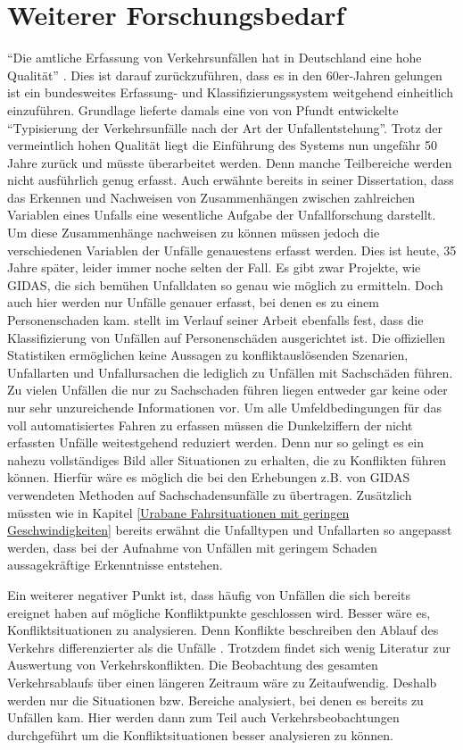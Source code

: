 \section{Weiterer Forschungsbedarf}
\enquote{Die amtliche Erfassung von Verkehrsunfällen hat in Deutschland eine hohe Qualität} \parencite[S. 821]{Brilon.2016}. Dies ist darauf zurückzuführen, dass es in den 60er-Jahren gelungen ist ein bundesweites Erfassung- und Klassifizierungssystem weitgehend einheitlich einzuführen. Grundlage lieferte damals eine von von Pfundt entwickelte \enquote{Typisierung der Verkehrsunfälle nach der Art der Unfallentstehung}. Trotz der vermeintlich hohen Qualität liegt die Einführung des Systems nun ungefähr 50 Jahre zurück und müsste überarbeitet werden. Denn manche Teilbereiche werden nicht ausführlich genug erfasst. Auch \Textcite[S. 69]{Burger.1983} erwähnte bereits in seiner Dissertation, dass das Erkennen und Nachweisen von Zusammenhängen zwischen zahlreichen Variablen eines Unfalls eine wesentliche Aufgabe der Unfallforschung darstellt. Um diese Zusammenhänge nachweisen zu können müssen jedoch die verschiedenen Variablen der Unfälle genauestens erfasst werden. Dies ist heute, 35 Jahre später, leider immer noche selten der Fall. Es gibt zwar Projekte, wie \ac{GIDAS}, die sich bemühen Unfalldaten so genau wie möglich zu ermitteln. Doch auch hier werden nur Unfälle genauer erfasst, bei denen es zu einem Personenschaden kam. \Textcite[S. 18]{Gschwendtner.2015} stellt im Verlauf seiner Arbeit ebenfalls fest, dass die Klassifizierung von Unfällen auf Personenschäden ausgerichtet ist. Die offiziellen Statistiken ermöglichen keine Aussagen zu konfliktauslösenden Szenarien, Unfallarten und Unfallursachen die lediglich zu Unfällen mit Sachschäden führen. Zu vielen Unfällen die nur zu Sachschaden führen liegen entweder gar keine oder nur sehr unzureichende Informationen vor. Um alle Umfeldbedingungen für das voll automatisiertes Fahren zu erfassen müssen die Dunkelziffern der nicht erfassten Unfälle weitestgehend reduziert werden. Denn nur so gelingt es ein nahezu vollständiges Bild aller Situationen zu erhalten, die zu Konflikten führen können. Hierfür wäre es möglich die bei den Erhebungen z.B. von \ac{GIDAS} verwendeten Methoden auf Sachschadensunfälle zu übertragen. Zusätzlich müssten wie in Kapitel \ref{Urabane Fahrsituationen mit geringen Geschwindigkeiten} bereits erwähnt die Unfalltypen und Unfallarten so angepasst werden, dass bei der Aufnahme von Unfällen mit geringem Schaden aussagekräftige Erkenntnisse entstehen.
  
Ein weiterer negativer Punkt ist, dass häufig von Unfällen die sich bereits ereignet haben auf mögliche Konfliktpunkte geschlossen wird. Besser wäre es, Konfliktsituationen zu analysieren. Denn Konflikte beschreiben den Ablauf des Verkehrs differenzierter als die Unfälle \parencite[S. 13]{Erke.1978}. Trotzdem findet sich wenig Literatur zur Auswertung von Verkehrskonflikten. Die Beobachtung des gesamten Verkehrsablaufs über einen längeren Zeitraum wäre zu Zeitaufwendig. Deshalb werden nur die Situationen bzw. Bereiche analysiert, bei denen es bereits zu Unfällen kam. Hier werden dann zum Teil auch Verkehrsbeobachtungen durchgeführt um die Konfliktsituationen besser analysieren zu können.
